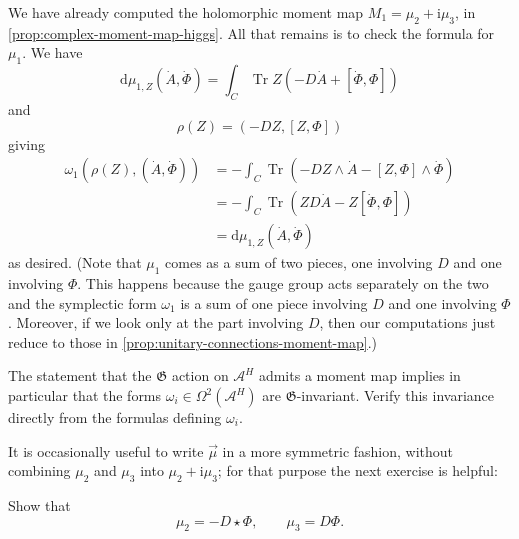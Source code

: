 \documentclass[12pt,letterpaper,reqno]{article}
\numberwithin{equation}{section}
\newcommand{\fG}{{\mathfrak G}}
\newcommand{\cA}{\ensuremath{\mathcal A}}
\newcommand{\I}{{\mathrm i}}
\newcommand{\de}{\mathrm{d}}
\DeclareMathOperator{\Tr}{Tr}
\begin{document}
\begin{pf} We have already computed the holomorphic moment map
$M_1 = \mu_2 + \I \mu_3$, in \autoref{prop:complex-moment-map-higgs}.
All that remains is to check the formula for $\mu_1$.
We have
\begin{equation}
  \de \mu_{1,Z}(\dot A, \dot \Phi) = \int_C \Tr Z\left(- D \dot{A} + [\dot\Phi,\Phi] \right)
\end{equation}
and
\begin{equation}
  \rho(Z) = (-DZ, [Z,\Phi])
\end{equation}
giving
\begin{align}
  \omega_1(\rho(Z), (\dot A, \dot \Phi)) &= - \int_C \Tr(- D Z \wedge \dot A - [Z,\Phi] \wedge \dot \Phi) \\
  &= - \int_C \Tr(Z D\dot A - Z[\dot \Phi, \Phi]) \\
  &= \de \mu_{1,Z}(\dot A, \dot \Phi)
\end{align}
as desired.
(Note that $\mu_1$ comes as a sum of two pieces, one involving $D$ and
one involving $\Phi$. This happens because the gauge group acts
separately on the two and the symplectic form $\omega_1$ is a sum
of one piece involving $D$ and one involving $\Phi$. Moreover, if
we look only at the part involving $D$, then our computations
just reduce to those in \autoref{prop:unitary-connections-moment-map}.)
\end{pf}

\begin{exercise} The statement that the $\fG$ action on $\cA^H$ admits a moment map
implies in particular that the forms $\omega_i \in \Omega^2(\cA^H)$ are $\fG$-invariant.
Verify this invariance directly from the formulas defining $\omega_i$.
\end{exercise}

It is occasionally useful to write $\vec\mu$ in a more symmetric fashion,
without combining $\mu_2$ and $\mu_3$ into $\mu_2 + \I \mu_3$; for that
purpose the next exercise is helpful:

\begin{exercise} Show that
\begin{equation}
  \mu_2 = -D \star \Phi, \qquad \mu_3 = D \Phi.
\end{equation}
\end{exercise}
\end{document}
